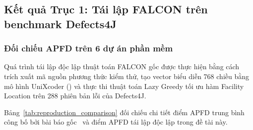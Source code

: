 \subsection{Kết quả Trục 1: Tái lập FALCON trên benchmark Defects4J}
\label{subsec:rq1_reproduction}

\subsubsection{Đối chiếu APFD trên 6 dự án phần mềm}
\label{subsubsec:reproduction_results}

Quá trình tái lập độc lập thuật toán FALCON gốc được thực hiện bằng cách trích xuất mã nguồn phương thức kiểm thử, tạo vector biểu diễn 768 chiều bằng mô hình UniXcoder () và thực thi thuật toán Lazy Greedy tối ưu hàm Facility Location trên 288 phiên bản lỗi của Defects4J.

Bảng~\ref{tab:reproduction_comparison} đối chiếu chi tiết điểm APFD trung bình công bố bởi bài báo gốc~\cite{falcon2026} và điểm APFD tái lập độc lập trong đề tài này.

